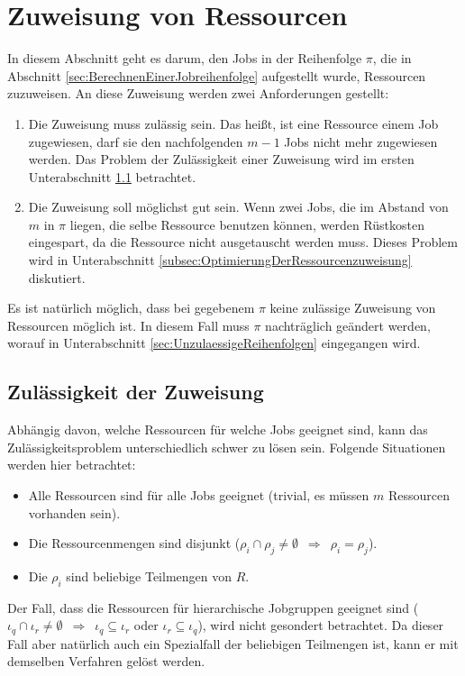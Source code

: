 \documentclass{scrreprt}
\begin{document}
\section{Zuweisung von Ressourcen}
\label{sec:ZuweisungVonRessourcen}
In diesem Abschnitt geht es darum, den Jobs in der Reihenfolge $\pi$, die in Abschnitt \ref{sec:BerechnenEinerJobreihenfolge} aufgestellt wurde,
Ressourcen zuzuweisen. An diese Zuweisung werden zwei Anforderungen gestellt:
\begin{enumerate}
    \item Die Zuweisung muss zulässig sein. Das heißt, ist eine Ressource einem Job zugewiesen, darf sie den nachfolgenden $m-1$ Jobs nicht mehr zugewiesen werden.
        Das Problem der Zulässigkeit einer Zuweisung wird im ersten Unterabschnitt \ref{subsec:ZulaessigkeitDerZuweisung} betrachtet.
    \item Die Zuweisung soll möglichst gut sein. Wenn zwei Jobs, die im Abstand von $m$ in $\pi$ liegen, die selbe Ressource benutzen können,
        werden Rüstkosten eingespart, da die Ressource nicht ausgetauscht werden muss.
        Dieses Problem wird in Unterabschnitt \ref{subsec:OptimierungDerRessourcenzuweisung} diskutiert.
\end{enumerate}
Es ist natürlich möglich, dass bei gegebenem $\pi$ keine zulässige Zuweisung von Ressourcen möglich ist.
In diesem Fall muss $\pi$ nachträglich geändert werden, worauf in Unterabschnitt \ref{sec:UnzulaessigeReihenfolgen} eingegangen wird.

\subsection{Zulässigkeit der Zuweisung}
\label{subsec:ZulaessigkeitDerZuweisung}
Abhängig davon, welche Ressourcen für welche Jobs geeignet sind, kann das Zulässigkeitsproblem unterschiedlich schwer zu lösen sein.
Folgende Situationen werden hier betrachtet:
\begin{itemize}
    \item Alle Ressourcen sind für alle Jobs geeignet (trivial, es müssen $m$ Ressourcen vorhanden sein).
    \item Die Ressourcenmengen sind disjunkt ($\rho_i\cap\rho_j \neq \emptyset \enspace \Rightarrow \enspace \rho_i = \rho_j$).
    \item Die $\rho_i$ sind beliebige Teilmengen von $R$.
\end{itemize}
Der Fall, dass die Ressourcen für hierarchische Jobgruppen geeignet sind 
($\iota_q\cap\iota_r \neq \emptyset \enspace \Rightarrow \enspace \iota_q\subseteq\iota_r$ oder $\iota_r\subseteq\iota_q$),
wird nicht gesondert betrachtet.
Da dieser Fall aber natürlich auch ein Spezialfall der beliebigen Teilmengen ist, kann er mit demselben Verfahren gelöst werden.
\end{document}

